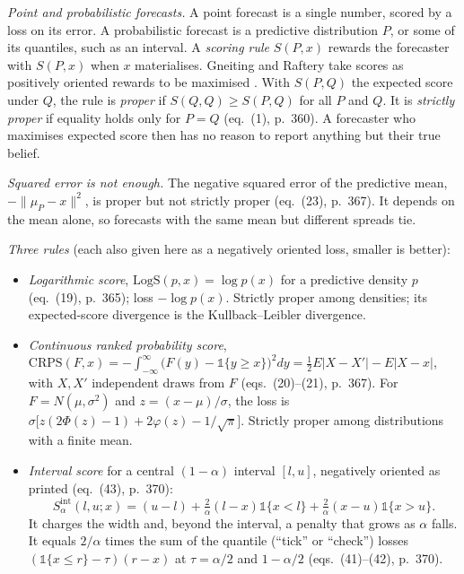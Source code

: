 \begin{qfmethod}\label{meth:proper-scoring-rules}
 \emph{Point and probabilistic forecasts.} A point forecast is a single number, scored by a loss on its error. A probabilistic forecast is a predictive distribution $P$, or some of its quantiles, such as an interval. A \emph{scoring rule} $S(P,x)$ rewards the forecaster with $S(P,x)$ when $x$ materialises. Gneiting and Raftery take scores as positively oriented rewards to be maximised \citep[JASA 102(477), 2007, p.~359]{wide-gneiting-raftery}. With $S(P,Q)$ the expected score under $Q$, the rule is \emph{proper} if $S(Q,Q)\ge S(P,Q)$ for all $P$ and $Q$. It is \emph{strictly proper} if equality holds only for $P=Q$ (eq.~(1), p.~360). A forecaster who maximises expected score then has no reason to report anything but their true belief.

\emph{Squared error is not enough.} The negative squared error of the predictive mean, $-\|\mu_P-x\|^2$, is proper but not strictly proper (eq.~(23), p.~367). It depends on the mean alone, so forecasts with the same mean but different spreads tie.

\emph{Three rules} (each also given here as a negatively oriented loss, smaller is better):
\begin{itemize}
\item \emph{Logarithmic score}, $\mathrm{LogS}(p,x)=\log p(x)$ for a predictive density $p$ (eq.~(19), p.~365); loss $-\log p(x)$. Strictly proper among densities; its expected-score divergence is the Kullback--Leibler divergence.
\item \emph{Continuous ranked probability score}, $\mathrm{CRPS}(F,x)=-\int_{-\infty}^{\infty}\bigl(F(y)-\mathbb 1\{y\ge x\}\bigr)^2dy=\tfrac12E|X-X'|-E|X-x|$, with $X,X'$ independent draws from $F$ (eqs.~(20)--(21), p.~367). For $F=N(\mu,\sigma^2)$ and $z=(x-\mu)/\sigma$, the loss is $\sigma\bigl[z(2\Phi(z)-1)+2\varphi(z)-1/\sqrt\pi\bigr]$. Strictly proper among distributions with a finite mean.
\item \emph{Interval score} for a central $(1-\alpha)$ interval $[l,u]$, negatively oriented as printed (eq.~(43), p.~370):
\[ S^{\mathrm{int}}_\alpha(l,u;x)=(u-l)+\tfrac2\alpha(l-x)\mathbb 1\{x<l\}+\tfrac2\alpha(x-u)\mathbb 1\{x>u\}. \]
It charges the width and, beyond the interval, a penalty that grows as $\alpha$ falls. It equals $2/\alpha$ times the sum of the quantile (``tick'' or ``check'') losses $(\mathbb 1\{x\le r\}-\tau)(r-x)$ at $\tau=\alpha/2$ and $1-\alpha/2$ (eqs.~(41)--(42), p.~370).
\end{itemize}


\end{qfmethod}
